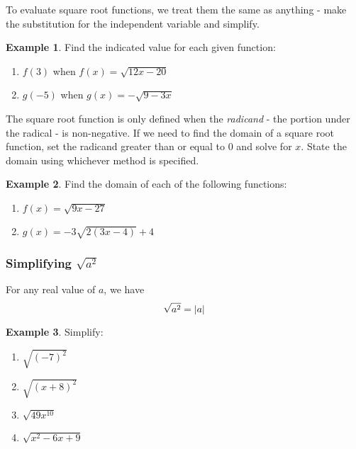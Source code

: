 \documentclass[addpoints,12pt]{exam}
\theoremstyle{definition}
\newtheorem{example}{Example}[subsection]
\begin{document}
To evaluate square root functions, we treat them the same as anything - make the substitution for the independent variable and simplify.

\vspace{.25in}

\begin{example}
Find the indicated value for each given function:
\begin{enumerate}
\item $f(3)$ when $f(x) = \sqrt{12x-20}$
\vspace{1.25in}
\item $g(-5)$ when $g(x) = -\sqrt{9-3x}$

\end{enumerate}
\end{example}

\newpage

The square root function is only defined when the \emph{radicand} - the portion under the radical - is non-negative. If we need to find the domain of a square root function, set the radicand greater than or equal to 0 and solve for $x$. State the domain using whichever method is specified.

\vspace{.25in}

\begin{example}
Find the domain of each of the following functions:
\begin{enumerate}
\item $f(x) = \sqrt{9x-27}$
\vspace{1.5in}
\item $g(x) = -3\sqrt{2(3x-4)}+4$
\vspace{1.5in}
\end{enumerate}
\end{example}

\subsubsection*{Simplifying $\sqrt{a^2}$}

For any real value of $a$, we have \[\sqrt{a^2} = \abs{a}\]

\begin{example}
Simplify:
\begin{enumerate}
\item $\sqrt{(-7)^2}$
\vspace{1.25in}
\newpage
\item $\sqrt{(x+8)^2}$
\vspace{1.25in}
\item $\sqrt{49x^{10}}$
\vspace{1.25in}
\item $\sqrt{x^2-6x+9}$
\vspace{1.5in}
\end{enumerate}
\end{example}
\end{document}
